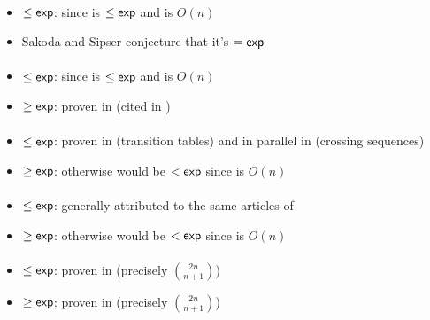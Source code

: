 \paragraph{\ONFA{}\tto\TDFA}
\begin{itemize}
	\item $\le\mathsf{exp}$: since \hyperref[cost:1NFAto1DFA]{\ONFA{}\tto\ODFA} is $\le\mathsf{exp}$ and \ODFA{}\tto\TDFA is $O(n)$
	\item Sakoda and Sipser conjecture that it's $=\mathsf{exp}$ \cite{SakSip78}
\end{itemize}
\paragraph{\TDFA{}\tto\ONFA}\label{cost:2DFAto1NFA}
\begin{itemize}
	\item $\le\mathsf{exp}$: since \hyperref[cost:1NFAto1DFA]{\ONFA{}\tto\ODFA} is $\le\mathsf{exp}$ and \ODFA{}\tto\ONFA is $O(n)$
	\item $\ge\mathsf{exp}$: proven in \cite{Bir93} (cited in \cite{PigPis14})
\end{itemize}
\paragraph{\TDFA{}\tto\ODFA}\label{cost:2DFAto1DFA}
\begin{itemize}
	\item $\le\mathsf{exp}$: proven in \cite{She59} (transition tables) and in parallel in \cite{RabSco59} (crossing sequences)
	\item $\ge\mathsf{exp}$: otherwise \hyperref[cost:2DFAto1NFA]{\TDFA{}\tto\ONFA} would be $<\mathsf{exp}$ since \ODFA{}\tto\ONFA is $O(n)$
\end{itemize}
\paragraph{\TNFA{}\tto\ODFA}\label{cost:2NFAto1DFA}
\begin{itemize}
	\item $\le\mathsf{exp}$: generally attributed to the same articles of \hyperref[cost:2DFAto1DFA]{\TDFA{}\tto\ODFA}
	\item $\ge\mathsf{exp}$: otherwise \hyperref[cost:1NFAto1DFA]{\ONFA{}\tto\ODFA} would be $<\mathsf{exp}$ since \ONFA{}\tto\TNFA is $O(n)$
\end{itemize}
\paragraph{\TNFA{}\tto\ONFA}
\begin{itemize}
	\item $\le\mathsf{exp}$: proven in \cite{Kap05} (precisely $\binom{2n}{n+1}$)
	\item $\ge\mathsf{exp}$: proven in \cite{Kap05} (precisely $\binom{2n}{n+1}$)
\end{itemize}
